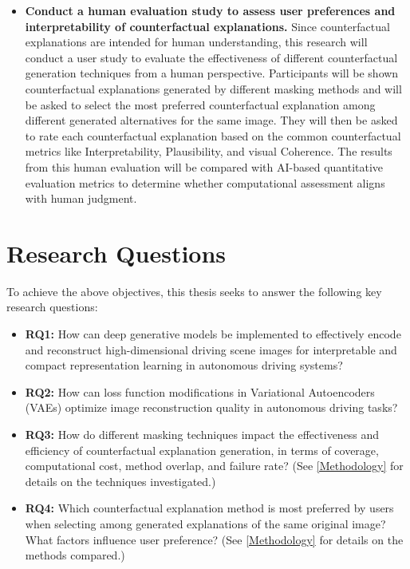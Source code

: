 \begin{itemize}
    \item \textbf{Conduct a human evaluation study to assess user preferences and interpretability of counterfactual explanations.}  
    Since counterfactual explanations are intended for human understanding, this research will conduct a user study to evaluate the effectiveness of different counterfactual generation techniques from a human perspective. Participants will be shown counterfactual explanations generated by different masking methods and will be asked to select the most preferred counterfactual explanation among different generated alternatives for the same image. They will then be asked to rate each counterfactual explanation based on the common counterfactual metrics like Interpretability, Plausibility, and visual Coherence. The results from this human evaluation will be compared with AI-based quantitative evaluation metrics to determine whether computational assessment aligns with human judgment.

\end{itemize}


\section{Research Questions} \label{sec:research_question}
To achieve the above objectives, this thesis seeks to answer the following key research questions:

\begin{itemize}
    \item \textbf{RQ1:} How can deep generative models be implemented to effectively encode and reconstruct high-dimensional driving scene images for interpretable and compact representation learning in autonomous driving systems?

    \item \textbf{RQ2:} How can loss function modifications in Variational Autoencoders (VAEs) optimize image reconstruction quality in autonomous driving tasks? 
    
    \item \textbf{RQ3:} How do different masking techniques impact the effectiveness and efficiency of counterfactual explanation generation, in terms of coverage, computational cost, method overlap, and failure rate?  (See \cref{Methodology} for details on the techniques investigated.) 

    \item \textbf{RQ4:} Which counterfactual explanation method is most preferred by users when selecting among generated explanations of the same original image? What factors influence user preference? (See \cref{Methodology} for details on the methods compared.)
\end{itemize}

